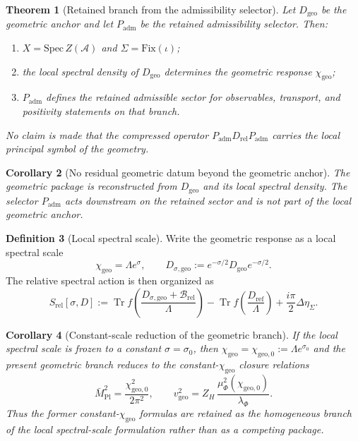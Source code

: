 \documentclass[11pt,a4paper]{article}
\newtheorem{theorem}{Theorem}[section]
\newtheorem{corollary}[theorem]{Corollary}
\theoremstyle{definition}
\newtheorem{definition}[theorem]{Definition}
\theoremstyle{remark}
\DeclareMathOperator{\tr}{Tr}
\newcommand{\Seam}{\Sigma}
\newcommand{\inv}{\iota}
\newcommand{\Mpl}{\bar M_{\mathrm{Pl}}}
\newcommand{\chigeo}{\chi_{\mathrm{geo}}}
\newcommand{\chigeozero}{\chi_{\mathrm{geo},0}}
\newcommand{\vgeo}{v_{\mathrm{geo}}}
\newcommand{\Padm}{P_{\mathrm{adm}}}
\begin{document}
\begin{theorem}[Retained branch from the admissibility selector]
\label{thm:retained-branch-from-Padm}
\label{thm:admissible-sector-on-reconstructed-geometry}
\label{thm:full-operator-reconstruction}
Let $D_{\mathrm{geo}}$ be the geometric anchor and let $\Padm$ be the retained
admissibility selector.
Then:
\begin{enumerate}[label=(\roman*), leftmargin=1.5em, topsep=3pt, itemsep=2pt]
\item $X=\mathrm{Spec}\,Z(\mathcal A)$ and $\Seam=\mathrm{Fix}(\inv)$;
\item the local spectral density of $D_{\mathrm{geo}}$ determines the geometric response
      $\chigeo$;
\item $\Padm$ defines the retained admissible sector for observables, transport,
      and positivity statements on that branch.
\end{enumerate}
No claim is made that the compressed operator $\Padm D_{\mathrm{rel}}\Padm$
carries the local principal symbol of the geometry.
\end{theorem}

\begin{corollary}[No residual geometric datum beyond the geometric anchor]
The geometric package is reconstructed from $D_{\mathrm{geo}}$ and its local spectral density.
The selector $\Padm$ acts downstream on the retained sector and is not part of the
local geometric anchor.
\end{corollary}

\begin{definition}[Local spectral scale]
\label{def:local-spectral-scale}
Write the geometric response as a local spectral scale
\[
\chigeo=\Lambda e^\sigma,
\qquad
D_{\sigma,\mathrm{geo}}:=e^{-\sigma/2}D_{\mathrm{geo}}e^{-\sigma/2}.
\]
The relative spectral action is then organized as
\[
S_{\mathrm{rel}}[\sigma,D]
:=
\tr f\!\left(\frac{D_{\sigma,\mathrm{geo}}+\mathcal B_{\mathrm{rel}}}{\Lambda}\right)
-\tr f\!\left(\frac{D_{\mathrm{ref}}}{\Lambda}\right)
+\frac{i\pi}{2}\Delta\eta_\Sigma.
\]
\end{definition}

\begin{corollary}[Constant-scale reduction of the geometric branch]
\label{cor:constant-scale-reduction}
If the local spectral scale is frozen to a constant $\sigma=\sigma_0$, then $\chigeo=\chigeozero:=\Lambda e^{\sigma_0}$ and the present geometric branch reduces to the constant-$\chigeo$ closure relations
\[
\Mpl^2=\frac{\chigeozero^2}{2\pi^2},
\qquad
\vgeo^2=Z_H\,\frac{\mu_\Phi^2(\chigeozero)}{\lambda_\Phi}.
\]
Thus the former constant-$\chigeo$ formulas are retained as the homogeneous branch of the local spectral-scale formulation rather than as a competing package.
\end{corollary}
\end{document}
